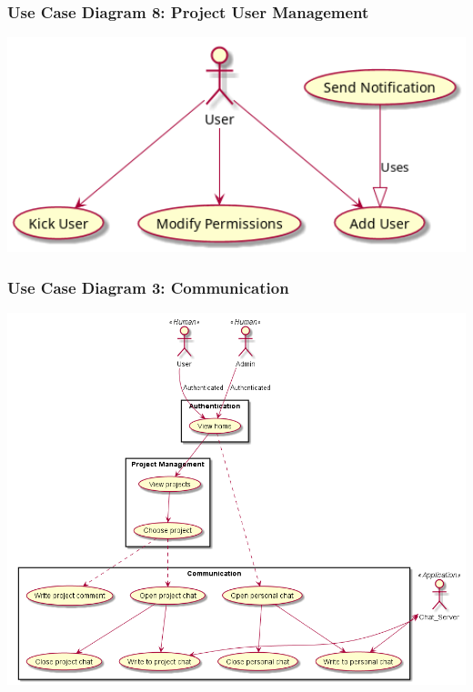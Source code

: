 \documentclass[twoside,letterpaper]{article}
\begin{document}
	\newpage
	
	\subsubsection[Use Case Diagram 8: Project User Management]{\rmfamily\bfseries\color{black}
		Use Case Diagram 8: Project User Management}
	
	\includegraphics[width=6.0in]{images/UseCaseDiagrams/ProjectUserManagement}
	
	\newpage
	
	\subsubsection[Use Case Diagram 3: Communication]{\rmfamily\bfseries\color{black}
		Use Case Diagram 3: Communication}
	
	\includegraphics[width=6.0in]{images/UseCaseDiagrams/Communication}
	
\end{document}
